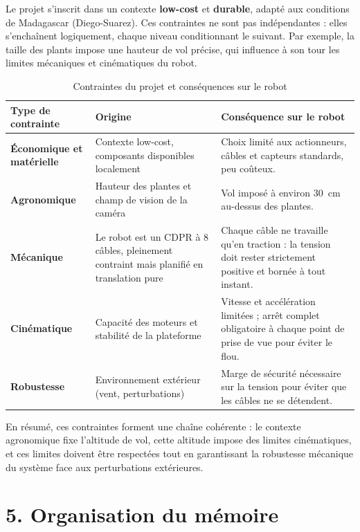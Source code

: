 Le projet s'inscrit dans un contexte \textbf{low-cost} et \textbf{durable}, adapté aux conditions de Madagascar (Diego-Suarez). Ces contraintes ne sont pas indépendantes : elles s'enchaînent logiquement, chaque niveau conditionnant le suivant. Par exemple, la taille des plants impose une hauteur de vol précise, qui influence à son tour les limites mécaniques et cinématiques du robot.

\begin{table}[H]
\centering
\caption{Contraintes du projet et conséquences sur le robot}
\label{tab:contraintes}
\begin{tabular}{|>{\raggedright\arraybackslash}p{3.0cm}|>{\raggedright\arraybackslash}p{4.2cm}|>{\raggedright\arraybackslash}p{6.0cm}|}
\hline
\textbf{Type de contrainte} & \textbf{Origine} & \textbf{Conséquence sur le robot} \\
\hline
\textbf{Économique et matérielle} & Contexte low-cost, composants disponibles localement & Choix limité aux actionneurs, câbles et capteurs standards, peu coûteux. \\
\hline
\textbf{Agronomique} & Hauteur des plantes et champ de vision de la caméra & Vol imposé à environ 30~cm au-dessus des plantes. \\
\hline
\textbf{Mécanique} & Le robot est un CDPR à 8 câbles, pleinement contraint mais planifié en translation pure & Chaque câble ne travaille qu'en traction : la tension doit rester strictement positive et bornée à tout instant. \\
\hline
\textbf{Cinématique} & Capacité des moteurs et stabilité de la plateforme & Vitesse et accélération limitées ; arrêt complet obligatoire à chaque point de prise de vue pour éviter le flou. \\
\hline
\textbf{Robustesse} & Environnement extérieur (vent, perturbations) & Marge de sécurité nécessaire sur la tension pour éviter que les câbles ne se détendent. \\
\hline
\end{tabular}
\end{table}

En résumé, ces contraintes forment une chaîne cohérente : le contexte agronomique fixe l'altitude de vol, cette altitude impose des limites cinématiques, et ces limites doivent être respectées tout en garantissant la robustesse mécanique du système face aux perturbations extérieures.

\section*{5. Organisation du mémoire}

